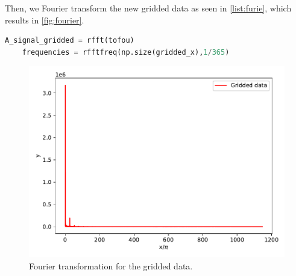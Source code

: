 Then, we Fourier transform the new gridded data as seen in \autoref{list:furie}, which results in \autoref{fig:fourier}.

\begin{lstlisting}[language = Python, caption={Implementation of the Fourier transformation.}, label = {list:furie}]
    A_signal_gridded = rfft(tofou)
    frequencies = rfftfreq(np.size(gridded_x),1/365)
\end{lstlisting}

\begin{figure}[H]
    \centering
    \includegraphics{plots/furie.pdf}
    \caption{Fourier transformation for the gridded data.}
    \label{fig:fourier}
\end{figure}